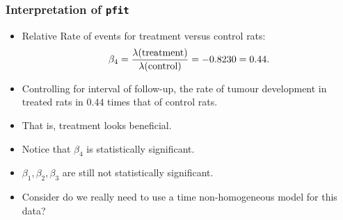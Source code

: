 \documentclass[oneside]{book}\usepackage[]{graphicx}\usepackage[svgnames]{xcolor}
\let\exp\relax%
\begin{document}
\subsubsection*{Interpretation of \texttt{pfit}}
\begin{itemize}
    \item Relative Rate of events for treatment versus control rats:
          \[ \exp{\beta_4}=\frac{\lambda(\text{treatment})}{\lambda(\text{control})}=\exp{-0.8230}=0.44. \]
    \item Controlling for interval of follow-up, the rate of tumour development in treated rats
          in $0.44$ times that of control rats.
    \item That is, treatment looks beneficial.
    \item Notice that $ \beta_4 $ is statistically significant.
    \item $ \beta_1,\beta_2,\beta_3 $ are still not statistically significant.
    \item Consider do we really need to use a time non-homogeneous model for this data?
\end{itemize}
\end{document}
